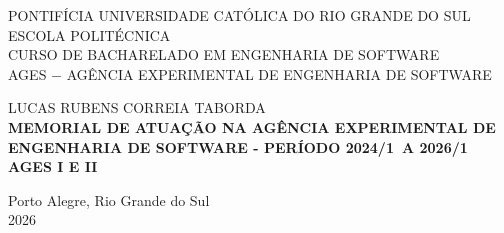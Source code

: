 \author{Lucas Rubens Correia Taborda}
\def\autor{\uppercase{Lucas Rubens Correia Taborda}}
\def\inicio{2024/1}
\def\fim{2026/1}
\def\ages{I e II}
\def\local{Porto Alegre, Rio Grande do Sul}
\def\ano{2026}

\begin{capa}
  \centering
    \uppercase{
      PONTIFÍCIA UNIVERSIDADE CATÓLICA DO RIO GRANDE DO SUL\\
      ESCOLA POLITÉCNICA\\
      CURSO DE BACHARELADO EM ENGENHARIA DE SOFTWARE\\
      AGES $-$ AGÊNCIA EXPERIMENTAL DE ENGENHARIA DE SOFTWARE\\
      }

    \vfill
    \autor\\
    \vfill
    \textbf{
      \uppercase{
        Memorial de atuação na Agência Experimental de Engenharia de Software 
        {-} Período \inicio\ a \fim\
        \\AGES \ages\
      }
    }
    
    \vfill

    \vfill
    \local\\
    \ano\
  \end{capa}